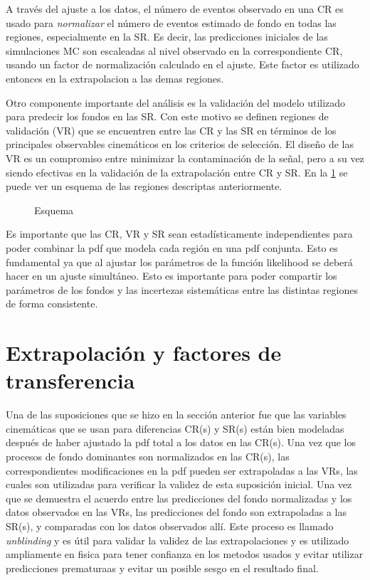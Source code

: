 A través del ajuste a los datos, el número de eventos observado en una CR es usado para
\emph{normalizar} el número de eventos estimado de fondo en todas las regiones, especialmente
en la SR. Es decir, las predicciones iniciales de las simulaciones MC son escaleadas al
nivel observado en la correspondiente CR, usando un factor de normalización calculado en
el ajuste. Este factor es utilizado entonces en la extrapolacion a las demas regiones.

Otro componente importante del análisis es la validación del modelo utilizado
para predecir los fondos en las SR. Con este motivo se definen regiones de validación
(VR) que se encuentren entre las CR y las SR en términos de los principales observables
cinemáticos en los criterios de selección. El diseño de las VR es un compromiso entre
minimizar la contaminación de la señal, pero a su vez siendo efectivas en la validación
de la extrapolación entre CR y SR. En la {\fig} \ref{fig:regions_sketch} se puede ver
un esquema de las regiones descriptas anteriormente.

\begin{figure}[h]
  \centering
  
  \caption{Esquema}
  \label{fig:regions_sketch}
\end{figure}

Es importante que las CR, VR y SR sean estadísticamente independientes para poder combinar
la pdf que modela cada región en una pdf conjunta. Esto es fundamental ya que al ajustar
los parámetros de la función likelihood se deberá hacer en un ajuste simultáneo. Esto es
importante para poder compartir los parámetros de los fondos y las incertezas sistemáticas
entre las distintas regiones de forma consistente.

\section{Extrapolación y factores de transferencia}

Una de las suposiciones que se hizo en la sección anterior fue que las variables cinemáticas
que se usan para diferencias CR(s) y SR(s) están bien modeladas después de haber ajustado
la pdf total a los datos en las CR(s).
Una vez que los procesos de fondo dominantes son normalizados en las CR(s), las
correspondientes modificaciones en la pdf pueden ser extrapoladas a las VRs, las cuales
son utilizadas para verificar la validez de esta suposición inicial.
Una vez que se demuestra el acuerdo entre las predicciones del fondo normalizadas y los datos observados
en las VRs, las predicciones del fondo son extrapoladas a las SR(s), y comparadas con los
datos observados allí. Este proceso es llamado \emph{unblinding} y es útil para validar
la validez de las extrapolaciones y es utilizado ampliamente en fisica para tener confianza
en los metodos usados y evitar utilizar predicciones prematuraas y evitar un posible sesgo
en el resultado final.

